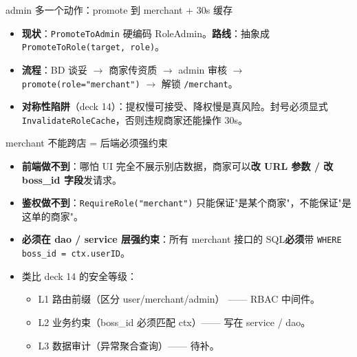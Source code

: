 \begin{frame}{admin 多一个动作：promote 到 merchant + 30s 缓存}
\vspace{1mm}
\begin{itemize}
  \item \textbf{现状}：\texttt{PromoteToAdmin} 硬编码 RoleAdmin。\textbf{路线}：抽象成 \texttt{PromoteToRole(target, role)}。
  \item \textbf{流程}：BD 谈妥 $\to$ 商家传资质 $\to$ admin 审核 $\to$ \texttt{promote(role="merchant")} $\to$ 解锁 \texttt{/merchant}。
  \item \textbf{对称性陷阱}（deck 14）：提权慢可接受、降权慢是真风险。封号必须显式 \texttt{InvalidateRoleCache}，否则违规商家还能操作 30s。
\end{itemize}
\end{frame}

\begin{frame}{merchant 不能跨店 = 后端必须强约束}
\begin{itemize}
  \item \textbf{前端做不到}：哪怕 UI 完全不展示别店数据，商家可以\textbf{改 URL 参数 / 改 boss\_id 字段}发请求。
  \item \textbf{鉴权做不到}：\texttt{RequireRole("merchant")} 只能保证"是某个商家"，不能保证"是这单的商家"。
  \item \textbf{必须在 dao / service 层强约束}：所有 merchant 接口的 SQL\textbf{必须}带 \texttt{WHERE boss\_id = ctx.userID}。
  \item 类比 deck 14 的安全等级：
  \begin{itemize}
    \item L1 路由前缀（区分 user/merchant/admin） —— RBAC 中间件。
    \item L2 业务约束（boss\_id 必须匹配 ctx）—— 写在 service / dao。
    \item L3 数据审计（异常聚合查询）—— 待补。
  \end{itemize}
\end{itemize}
\end{frame}

